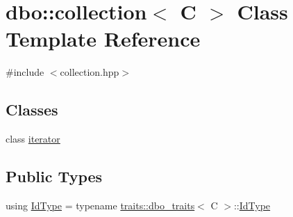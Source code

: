 \hypertarget{classdbo_1_1collection}{\section{dbo\+:\+:collection$<$ C $>$ Class Template Reference}
\label{classdbo_1_1collection}
}


{\ttfamily \#include $<$collection.\+hpp$>$}

\subsection*{Classes}
\begin{DoxyCompactItemize}
\item 
class \hyperlink{classdbo_1_1collection_1_1iterator}{iterator}
\end{DoxyCompactItemize}
\subsection*{Public Types}
\begin{DoxyCompactItemize}
\item 
using \hyperlink{classdbo_1_1collection_ad004dc216c503f08d75c1d3e3fffe803}{Id\+Type} = typename \hyperlink{structdbo_1_1traits_1_1dbo__traits}{traits\+::dbo\+\_\+traits}$<$ C $>$\+::\hyperlink{classdbo_1_1collection_ad004dc216c503f08d75c1d3e3fffe803}{Id\+Type}
\end{DoxyCompactItemize}
